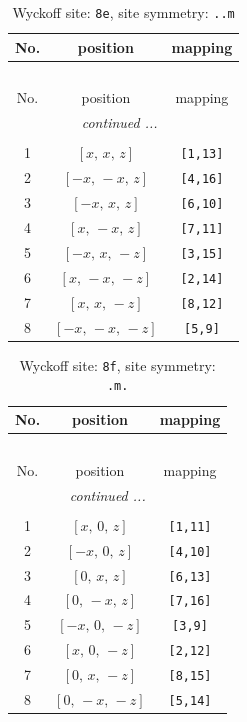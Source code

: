 \documentclass[fleqn,8pt]{jsarticle}
\begin{document}
\begin{longtable}{ccc}
\caption{Wyckoff site: {\tt 8e}, site symmetry: {\tt ..m}}
 \\
 \hline \hline
No. & position & mapping \\ \hline \endfirsthead

\multicolumn{2}{l}{\tablename\ \thetable{}} \\
 \hline \hline
No. & position & mapping \\ \hline \endhead

 \hline \hline
\multicolumn{2}{r}{\footnotesize\it continued ...} \\ \endfoot

 \hline \hline
\multicolumn{2}{r}{} \\ \endlastfoot

1 & $\left[ x,\, x,\, z \right]$ & {\tt [1,13]} \\ \hline
2 & $\left[ - x,\, - x,\, z \right]$ & {\tt [4,16]} \\ \hline
3 & $\left[ - x,\, x,\, z \right]$ & {\tt [6,10]} \\ \hline
4 & $\left[ x,\, - x,\, z \right]$ & {\tt [7,11]} \\ \hline
5 & $\left[ - x,\, x,\, - z \right]$ & {\tt [3,15]} \\ \hline
6 & $\left[ x,\, - x,\, - z \right]$ & {\tt [2,14]} \\ \hline
7 & $\left[ x,\, x,\, - z \right]$ & {\tt [8,12]} \\ \hline
8 & $\left[ - x,\, - x,\, - z \right]$ & {\tt [5,9]} \\
\end{longtable}
\renewcommand{\arraystretch}{1.2}
\begin{longtable}{ccc}
\caption{Wyckoff site: {\tt 8f}, site symmetry: {\tt .m.}}
 \\
 \hline \hline
No. & position & mapping \\ \hline \endfirsthead

\multicolumn{2}{l}{\tablename\ \thetable{}} \\
 \hline \hline
No. & position & mapping \\ \hline \endhead

 \hline \hline
\multicolumn{2}{r}{\footnotesize\it continued ...} \\ \endfoot

 \hline \hline
\multicolumn{2}{r}{} \\ \endlastfoot

1 & $\left[ x,\, 0,\, z \right]$ & {\tt [1,11]} \\ \hline
2 & $\left[ - x,\, 0,\, z \right]$ & {\tt [4,10]} \\ \hline
3 & $\left[ 0,\, x,\, z \right]$ & {\tt [6,13]} \\ \hline
4 & $\left[ 0,\, - x,\, z \right]$ & {\tt [7,16]} \\ \hline
5 & $\left[ - x,\, 0,\, - z \right]$ & {\tt [3,9]} \\ \hline
6 & $\left[ x,\, 0,\, - z \right]$ & {\tt [2,12]} \\ \hline
7 & $\left[ 0,\, x,\, - z \right]$ & {\tt [8,15]} \\ \hline
8 & $\left[ 0,\, - x,\, - z \right]$ & {\tt [5,14]} \\
\end{longtable}
\end{document}
